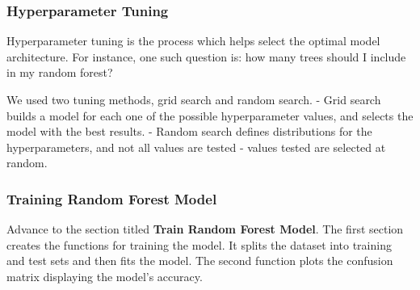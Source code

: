 \documentclass[
]{article}
\begin{document}
\hypertarget{hyperparameter-tuning}{%
\subsubsection{Hyperparameter Tuning}\label{hyperparameter-tuning}}

Hyperparameter tuning is the process which helps select the optimal model architecture. For instance, one such question is: how many trees should I include in my random forest?

We used two tuning methods, grid search and random search.
- Grid search builds a model for each one of the possible hyperparameter values, and selects the model with the best results.
- Random search defines distributions for the hyperparameters, and not all values are tested - values tested are selected at random.

\hypertarget{training-random-forest-model}{%
\subsubsection{Training Random Forest Model}\label{training-random-forest-model}}

Advance to the section titled \textbf{Train Random Forest Model}. The first section creates the functions for training the model. It splits the dataset into training and test sets and then fits the model. The second function plots the confusion matrix displaying the model's accuracy.
\end{document}
